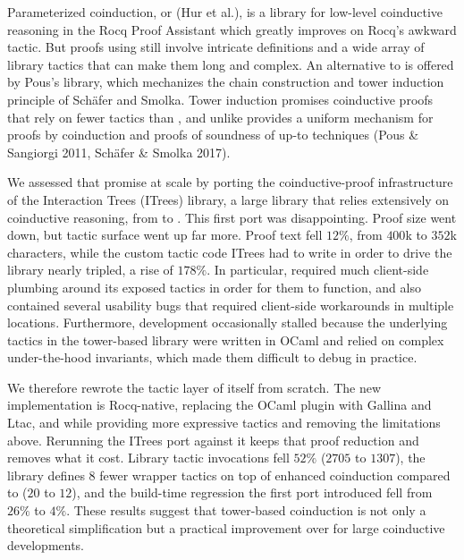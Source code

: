 Parameterized coinduction, or  (Hur et al.), is a library for
low-level coinductive reasoning in the Rocq Proof Assistant which greatly
improves on Rocq's awkward  tactic. But proofs using 
still involve intricate definitions and a wide array of library tactics that can
make them long and complex. An alternative to  is offered by Pous's
 library, which mechanizes the chain construction and
tower induction principle of Schäfer and Smolka. Tower induction promises
coinductive proofs that rely on fewer tactics than , and unlike
 provides a uniform mechanism for proofs by coinduction and proofs of
soundness of up-to techniques (Pous \& Sangiorgi 2011, Schäfer \& Smolka 2017).

We assessed that promise at scale by porting the coinductive-proof
infrastructure of the Interaction Trees (ITrees) library, a large library that
relies extensively on coinductive reasoning, from  to
. This first port was disappointing. Proof size went
down, but tactic surface went up far more. Proof text fell $12\%$, from $400$k to
$352$k characters, while the custom tactic code ITrees had to write in order to
drive the library nearly tripled, a rise of $178\%$. In particular,
 required much client-side plumbing around its exposed
tactics in order for them to function, and also contained several usability bugs
that required client-side workarounds in multiple locations. Furthermore,
development occasionally stalled because the underlying tactics in the
tower-based library were written in OCaml and relied on complex under-the-hood
invariants, which made them difficult to debug in practice.

We therefore rewrote the tactic layer of  itself from
scratch. The new implementation is Rocq-native, replacing the OCaml plugin with
Gallina and Ltac, and \igap{\tacImplClaim{}} while providing more expressive
tactics and removing the limitations above. Rerunning the ITrees port against it
keeps that proof reduction and removes what it cost. Library tactic invocations
fell $52\%$ ($2705$ to $1307$), the library defines $8$ fewer wrapper tactics on
top of enhanced coinduction compared to  ($20$ to $12$), and the
build-time regression the first port introduced fell from $26\%$ to $4\%$. These
results suggest that tower-based coinduction is not only a theoretical
simplification but a practical improvement over  for large
coinductive developments.

